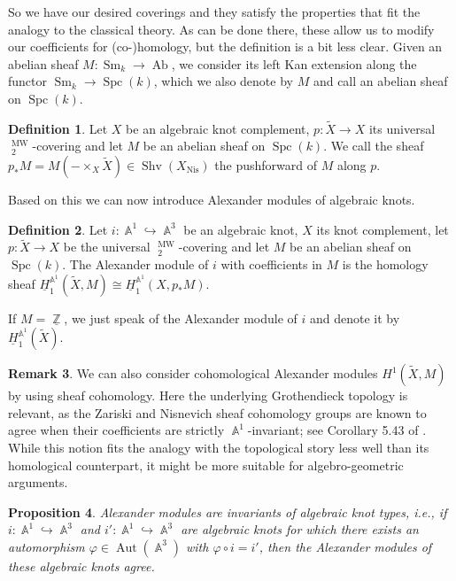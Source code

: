 \documentclass[english]{amsart}
\newtheorem{prop}{Proposition}[section]
\theoremstyle{definition}
\newtheorem{rem}[prop]{Remark}
\newtheorem{de}[prop]{Definition}
\DeclareMathOperator{\Z}{\mathbb{Z}}
\DeclareMathOperator{\A}{\mathbb{A}}
\DeclareMathOperator{\Aut}{Aut}
\DeclareMathOperator{\Ab}{Ab}
\DeclareMathOperator{\Spc}{Spc}
\DeclareMathOperator{\Sm}{Sm}
\DeclareMathOperator{\Nis}{Nis}
\DeclareMathOperator{\Shv}{Shv}
\DeclareMathOperator{\KK}{\underline{K}}
\DeclareMathOperator{\MW}{MW}
\begin{document}
So we have our desired coverings and they satisfy the properties that fit the analogy to the classical theory. As can be done there, these allow us to modify our coefficients for (co-)homology, but the definition is a bit less clear. Given an abelian sheaf $M \colon \Sm_k \rightarrow \Ab$, we consider its left Kan extension along the functor $\Sm_k \rightarrow \Spc(k)$, which we also denote by $M$ and call an abelian sheaf on $\Spc(k)$. 
\begin{de}
Let $X$ be an algebraic knot complement, $p \colon \widetilde{X} \rightarrow X$ its universal $\KK^{\MW}_2$-covering and let $M$ be an abelian sheaf on $\Spc(k)$. We call the sheaf $p_*M = M(- \times_X \widetilde{X}) \in \Shv(X_{\Nis})$ the pushforward of $M$ along $p$.
\end{de}
Based on this we can now introduce Alexander modules of algebraic knots.
\begin{de}
Let $i \colon \A^1 \hookrightarrow \A^3$ be an algebraic knot, $X$ its knot complement, let $p \colon \widetilde{X} \rightarrow X$ be the universal $\KK^{\MW}_2$-covering and let $M$ be an abelian sheaf on $\Spc(k)$. The Alexander module of $i$ with coefficients in $M$ is the homology sheaf $\underline{H}_1^{\A^1}\!(\widetilde{X},M) \cong \underline{H}_1^{\A^1}\!(X,p_*M)$.
\end{de}
If $M = \underline{\Z}$, we just speak of the Alexander module of $i$ and denote it by $\underline{H}_1^{\A^1}\!(\widetilde{X})$.
\begin{rem}
We can also consider cohomological Alexander modules $H^1(\widetilde{X},M)$ by using sheaf cohomology. Here the underlying Grothendieck topology is relevant, as the Zariski and Nisnevich sheaf cohomology groups are known to agree when their coefficients are strictly $\A^1$-invariant; see Corollary 5.43 of \cite{MR2934577}. While this notion fits the analogy with the topological story less well than its homological counterpart, it might be more suitable for algebro-geometric arguments.
\end{rem}
\begin{prop}\label{Alexander mods detect alg knot types}
Alexander modules are invariants of algebraic knot types, i.e., if $i \colon \A^1 \hookrightarrow \A^3$ and $i' \colon \A^1 \hookrightarrow \A^3$ are algebraic knots for which there exists an automorphism $\varphi \in \Aut(\A^3)$ with $\varphi \circ i = i'$, then the Alexander modules of these algebraic knots agree.
\end{prop}
\end{document}

